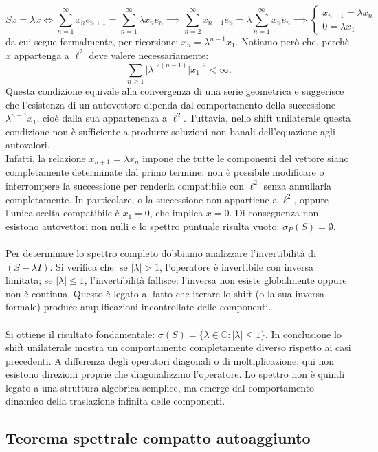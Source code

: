 \documentclass[a4paper,12pt]{report}
\begin{document}
\[
Sx=\lambda x\iff \sum_{n=1}^\infty x_ne_{n+1}=\sum_{n=1}^\infty \lambda x_ne_n\implies \sum_{n=2}^\infty x_{n-1}e_n=\lambda\sum_{n=1}^\infty x_n e_n\implies \begin{cases}
    x_{n-1}=\lambda x_n
    \\ 0=\lambda x_1
\end{cases}
\]
da cui segue formalmente, per ricorsione: $x_n = \lambda^{n-1} x_1$. Notiamo però che, perchè $x$ appartenga a $\ell^2$ deve valere necessariamente:
\[
\sum_{n\ge1} |\lambda|^{2(n-1)} |x_1|^2 < \infty.
\]
Questa condizione equivale alla convergenza di una serie geometrica e suggerisce che l’esistenza di un autovettore dipenda dal comportamento della successione $\lambda^{n-1}x_1$, cioè dalla sua appartenenza a $\ell^2$. Tuttavia, nello shift unilaterale questa condizione non è sufficiente a produrre soluzioni non banali dell’equazione agli autovalori.
\\Infatti, la relazione $x_{n+1}=\lambda x_n$ impone che tutte le componenti del vettore siano completamente determinate dal primo termine: non è possibile modificare o interrompere la successione per renderla compatibile con $\ell^2$ senza annullarla completamente. In particolare, o la successione non appartiene a $\ell^2$, oppure l’unica scelta compatibile è $x_1=0$, che implica $x=0$. Di conseguenza non esistono autovettori non nulli e lo spettro puntuale risulta vuoto: $\sigma_P(S)=\emptyset$.
\\
\\Per determinare lo spettro completo dobbiamo analizzare l’invertibilità di $(S-\lambda I)$. Si verifica che: se $|\lambda|>1$, l’operatore è invertibile con inversa limitata; se $|\lambda|\le 1$, l’invertibilità fallisce: l’inversa non esiste globalmente oppure non è continua.
Questo è legato al fatto che iterare lo shift (o la sua inversa formale) produce amplificazioni incontrollate delle componenti.
\\
\\Si ottiene il risultato fondamentale: $\sigma(S)=\{\lambda \in \mathbb{C} : |\lambda|\le 1\}$. In conclusione lo shift unilaterale mostra un comportamento completamente diverso rispetto ai casi precedenti. A differenza degli operatori diagonali o di moltiplicazione, qui non esistono direzioni proprie che diagonalizzino l’operatore. Lo spettro non è quindi legato a una struttura algebrica semplice, ma emerge dal comportamento dinamico della traslazione infinita delle componenti.

\subsection{Teorema spettrale compatto autoaggiunto}
\end{document}

